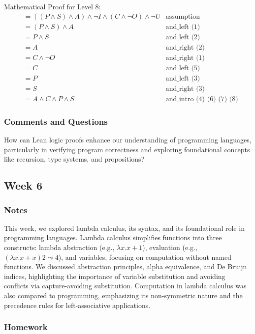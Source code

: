 \documentclass{article}
\theoremstyle{theorem}
\theoremstyle{definition}
\theoremstyle{remark}
\begin{document}
Mathematical Proof for Level 8:
\begin{align*}
  &= ((P \land S) \land A) \land \neg I \land (C \land \neg O) \land \neg U  & \text{assumption} \\
  &= (P \land S) \land A  & \text{and\_left (1)} \\
  &= P \land S  & \text{and\_left (2)} \\
  &= A  & \text{and\_right (2)} \\
  &= C \land \neg O  & \text{and\_right (1)} \\
  &= C  & \text{and\_left (5)} \\
  &= P  & \text{and\_left (3)} \\
  &= S  & \text{and\_right (3)} \\
  &= A \land C \land P \land S  & \text{and\_intro (4) (6) (7) (8)}
\end{align*}


\subsubsection*{Comments and Questions}

How can Lean logic proofs enhance our understanding of programming languages, particularly in verifying program correctness and exploring foundational concepts like recursion, type systems, and propositions?


\subsection{Week 6}

\subsubsection*{Notes}
This week, we explored lambda calculus, its syntax, and its foundational role in programming languages. Lambda calculus simplifies functions into three constructs: lambda abstraction (e.g., \(\lambda x.x + 1\)), evaluation (e.g., \((\lambda x.x + x)2 \leadsto 4\)), and variables, focusing on computation without named functions. We discussed abstraction principles, alpha equivalence, and De Bruijn indices, highlighting the importance of variable substitution and avoiding conflicts via capture-avoiding substitution. Computation in lambda calculus was also compared to programming, emphasizing its non-symmetric nature and the precedence rules for left-associative applications. 


\subsubsection*{Homework}
\end{document}
